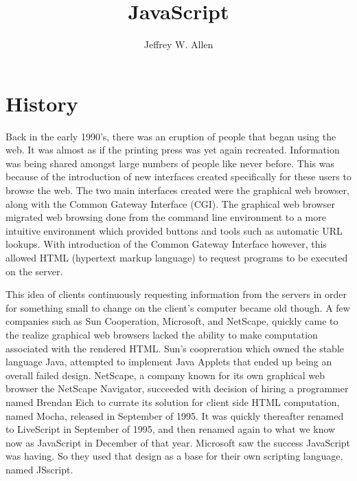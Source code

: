 \documentclass[man]{apa}
\title{JavaScript}
\author{Jeffrey W. Allen}
\affiliation{University of North Alabama\\ Florence, Alabama}
\begin{document}
\maketitle

\section{History}


% 
Back in the early 1990's, there was an eruption of people that began using the web. It was almost as if the printing press was yet again recreated. Information was being shared amongst large numbers of people like never before. This was because of the introduction of new interfaces created specifically for these users to browse the web. The two main interfaces created were the graphical web browser, along with the Common Gateway Interface (CGI). The graphical web browser migrated web browsing done from the command line environment to a more intuitive environment which provided buttons and tools such as automatic URL lookups. With introduction of the Common Gateway Interface however, this allowed HTML (hypertext markup language) to request programs to be executed on the server.


This idea of clients continuously requesting information from the servers in order for something small to change on the client's computer became old though. A few companies such as Sun Cooperation, Microsoft, and NetScape, quickly came to the realize graphical web browsers lacked the ability to make computation associated with the rendered HTML. Sun's coopreration which owned the stable language Java, attempted to implement Java Applets that ended up being an overall failed design. NetScape, a company known for its own graphical web browser the NetScape Navigator, succeeded with decision of hiring a programmer named Brendan Eich to currate its solution for client side HTML computation, named Mocha, released in September of 1995. It was quickly thereafter renamed to LiveScript in September of 1995, and then renamed again to what we know now as JavaScript in December of that year. Microsoft saw the success JavaScript was having. So they used that design as a base for their own scripting language, named JSscript.
\end{document}
